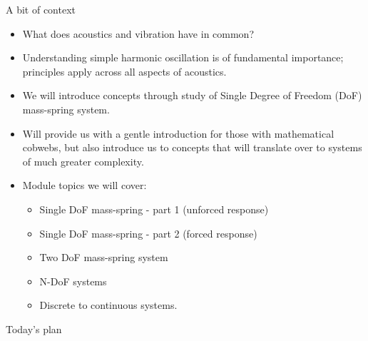 \documentclass[11pt,aspectratio=169,handout]{beamer}
\begin{document}
\begin{frame}[c]{A bit of context}
	\begin{itemize}
		\item<1-> What does acoustics and vibration have in common? 
		\item<2-> Understanding simple harmonic oscillation is of fundamental importance; principles apply across all aspects of acoustics.
		\item<3-> We will introduce concepts through study of Single Degree of Freedom (DoF) mass-spring system. 
		\item<4-> Will provide us with a gentle introduction for those with mathematical cobwebs, but also introduce us to concepts that will translate over to systems of much greater complexity. 
		\item<5-> Module topics we will cover:
		\begin{itemize}
			\item[1.] Single DoF mass-spring - part 1 (unforced response)
			\item[2.] Single DoF mass-spring - part 2 (forced response)
			\item[3.] Two DoF mass-spring system
			\item[4.] N-DoF systems
			\item[5.] Discrete to continuous systems.
		\end{itemize}
	\end{itemize}
\end{frame}


\addtocounter{section}{1}

\begin{frame}[c]{Today's plan}
	\vfill
	\tableofcontents[]
\end{frame}
\end{document}
